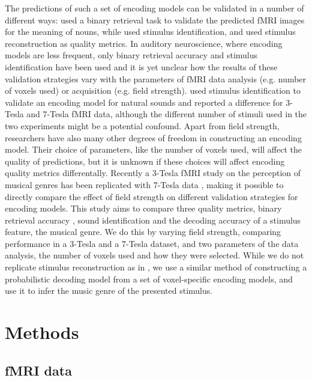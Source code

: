 The predictions of such a set of encoding models can be validated in a number of different ways:  \cite{ML08} used a binary retrieval task to
validate the predicted f{MRI} images for the meaning of nouns, while
\cite{KG+08} used stimulus identification, and \cite{NG09} used stimulus reconstruction
as quality metrics.
In auditory neuroscience, where encoding models are less frequent, only binary
retrieval accuracy \cite{CTK+2012} and stimulus identification \cite{SF14} have been used and it is yet unclear how the results of these validation strategies vary with the
parameters of f{MRI} data analysis (e.g. number of voxels used)  or acquisition (e.g. field strength).
\cite{SF14} used stimulus identification to validate an encoding model for natural sounds and reported a
difference for 3-Tesla and 7-Tesla f{MRI} data, although the different number of
stimuli used in the two experiments might be a potential confound. 
Apart from field strength, researchers have also many other degrees of freedom
in constructing an encoding model.
Their choice of parameters, like the number of voxels used, will affect the quality of predictions, but it is unknown
if these choices will affect encoding quality metrics differentally. 
Recently a 3-Tesla f{MRI} study on the perception of musical genres \cite{CTK+2012} has been replicated with 7-Tesla data
\cite{HDH+2015}, making it possible to directly compare the effect of field strength on
different validation strategies for encoding models.
This study aims to compare three quality metrics, binary retrieval accuracy \cite{ML08},
sound identification \cite{KG+08} \cite{SF14} and the decoding accuracy of a stimulus feature, the
musical genre. We do this by varying field strength, comparing
performance in a 3-Tesla and a 7-Tesla dataset, and two parameters of the data
analysis, the number of voxels used and how they were selected.
While we do not replicate stimulus reconstruction as in \cite{NG09}, we use a
similar method of constructing a probabilistic decoding model from a set of
voxel-specific encoding models, and use it to infer the music genre of the presented stimulus.


\section*{Methods}

\cite{HBI+14,HDH+2015}

\subsection*{fMRI data}

